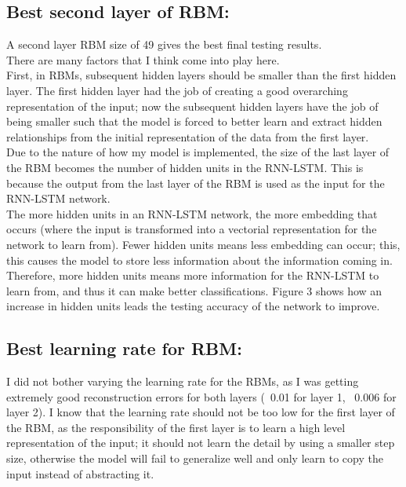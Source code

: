 \documentclass[a4paper]{article}
\begin{document}
\subsection{Best second layer of RBM:}
\hspace*{10mm}
A second layer RBM size of 49 gives the best final testing results.
\\\hspace*{10mm}
There are many factors that I think come into play here.
\\\hspace*{10mm}
First, in RBMs, subsequent hidden layers should be smaller than the first hidden layer. The first hidden layer had the job of creating a good overarching representation of the input; now the subsequent hidden layers have the job of being smaller such that the model is forced to better learn and extract hidden relationships from the initial representation of the data from the first layer.
\\\hspace*{10mm}
Due to the nature of how my model is implemented, the size of the last layer of the RBM becomes the number of hidden units in the RNN-LSTM. This is because the output from the last layer of the RBM is used as the input for the RNN-LSTM network.
\\\hspace*{10mm}
The more hidden units in an RNN-LSTM network, the more embedding that occurs (where the input is transformed into a vectorial representation for the network to learn from). Fewer hidden units means less embedding can occur; this, this causes the model to store less information about the information coming in. Therefore, more hidden units means more information for the RNN-LSTM to learn from, and thus it can make better classifications. Figure 3 shows how an increase in hidden units leads the testing accuracy of the network to improve.

\subsection{Best learning rate for RBM:}
\hspace*{10mm}
I did not bother varying the learning rate for the RBMs, as I was getting extremely good reconstruction errors for both layers (~0.01 for layer 1, ~0.006 for layer 2).
I know that the learning rate should not be too low for the first layer of the RBM, as the responsibility of the first layer is to learn a high level representation of the input; it should not learn the detail by using a smaller step size, otherwise the model will fail to generalize well and only learn to copy the input instead of abstracting it.
\end{document}
